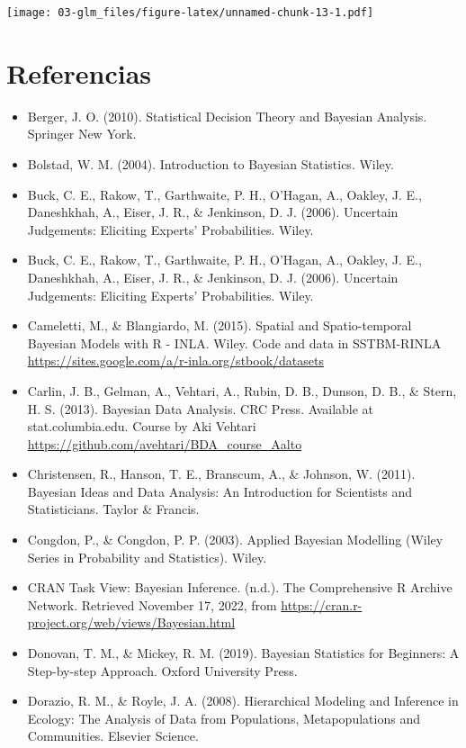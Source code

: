 \documentclass[
]{book}
\begin{document}
\texttt{[image: 03-glm\_files/figure-latex/unnamed-chunk-13-1.pdf]}

\hypertarget{referencias}{%
\chapter*{Referencias}\label{referencias}}

\begin{itemize}
\item
  Berger, J. O. (2010). Statistical Decision Theory and Bayesian Analysis. Springer New York.
\item
  Bolstad, W. M. (2004). Introduction to Bayesian Statistics. Wiley.
\item
  Buck, C. E., Rakow, T., Garthwaite, P. H., O'Hagan, A., Oakley, J. E., Daneshkhah, A., Eiser, J. R., \& Jenkinson, D. J. (2006). Uncertain Judgements: Eliciting Experts' Probabilities. Wiley.
\item
  Buck, C. E., Rakow, T., Garthwaite, P. H., O'Hagan, A., Oakley, J. E., Daneshkhah, A., Eiser, J. R., \& Jenkinson, D. J. (2006). Uncertain Judgements: Eliciting Experts' Probabilities. Wiley.
\item
  Cameletti, M., \& Blangiardo, M. (2015). Spatial and Spatio-temporal Bayesian Models with R - INLA. Wiley. Code and data in SSTBM-RINLA \url{https://sites.google.com/a/r-inla.org/stbook/datasets}
\item
  Carlin, J. B., Gelman, A., Vehtari, A., Rubin, D. B., Dunson, D. B., \& Stern, H. S. (2013). Bayesian Data Analysis. CRC Press. Available at stat.columbia.edu. Course by Aki Vehtari \url{https://github.com/avehtari/BDA_course_Aalto}
\item
  Christensen, R., Hanson, T. E., Branscum, A., \& Johnson, W. (2011). Bayesian Ideas and Data Analysis: An Introduction for Scientists and Statisticians. Taylor \& Francis.
\item
  Congdon, P., \& Congdon, P. P. (2003). Applied Bayesian Modelling (Wiley Series in Probability and Statistics). Wiley.
\item
  CRAN Task View: Bayesian Inference. (n.d.). The Comprehensive R Archive Network. Retrieved November 17, 2022, from \url{https://cran.r-project.org/web/views/Bayesian.html}
\item
  Donovan, T. M., \& Mickey, R. M. (2019). Bayesian Statistics for Beginners: A Step-by-step Approach. Oxford University Press.
\item
  Dorazio, R. M., \& Royle, J. A. (2008). Hierarchical Modeling and Inference in Ecology: The Analysis of Data from Populations, Metapopulations and Communities. Elsevier Science.

\end{itemize}
\end{document}
